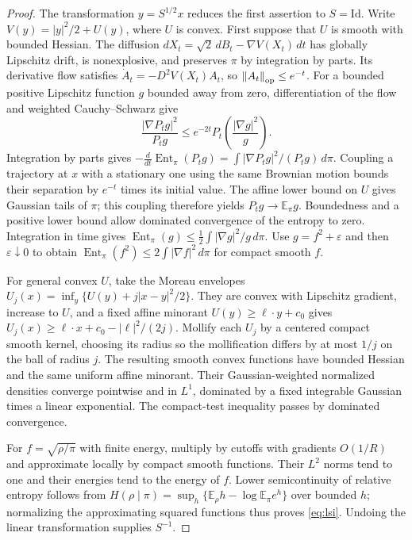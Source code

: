 \documentclass[11pt]{article}
\theoremstyle{remark}\newtheorem{remark}[theorem]{Remark}
\newcommand{\E}{\mathbb E}
\newcommand{\Id}{\mathrm{Id}}
\newcommand{\norm}[1]{\left\lVert #1\right\rVert}
\begin{document}
\begin{proof}
The transformation $y=S^{1/2}x$ reduces the first assertion to $S=\Id$.
Write $V(y)=|y|^2/2+U(y)$, where $U$ is convex. First suppose that $U$
is smooth with bounded Hessian. The diffusion
$dX_t=\sqrt2\,dB_t-\nabla V(X_t)\,dt$ has globally Lipschitz drift, is
nonexplosive, and preserves $\pi$ by integration by parts.
Its derivative flow satisfies $\dot A_t=-D^2V(X_t)A_t$, so
$\norm{A_t}_{\rm op}\le e^{-t}$. For a bounded positive Lipschitz function
$g$ bounded away from zero, differentiation of the flow and weighted
Cauchy--Schwarz give
\[
\frac{|\nabla P_tg|^2}{P_tg}
\le e^{-2t}P_t\!\left(\frac{|\nabla g|^2}{g}\right).
\]
Integration by parts gives
$-\frac{d}{dt}\operatorname{Ent}_\pi(P_tg)
=\int|\nabla P_tg|^2/(P_tg)\,d\pi$.
Coupling a trajectory at $x$ with a stationary one using the same Brownian
motion bounds their separation by $e^{-t}$ times its initial value.
The affine lower bound on $U$ gives Gaussian tails of $\pi$; this coupling
therefore yields $P_tg\to\E_\pi g$. Boundedness and a positive lower bound
allow dominated convergence of the entropy to zero. Integration in time
gives
$\operatorname{Ent}_\pi(g)\le\frac12\int|\nabla g|^2/g\,d\pi$.
Use $g=f^2+\varepsilon$ and then $\varepsilon\downarrow0$ to obtain
$\operatorname{Ent}_\pi(f^2)\le2\int|\nabla f|^2\,d\pi$ for compact smooth $f$.

For general convex $U$, take the Moreau envelopes
$U_j(x)=\inf_y\{U(y)+j|x-y|^2/2\}$.
They are convex with Lipschitz gradient, increase to $U$, and a fixed affine
minorant $U(y)\ge\ell\cdot y+c_0$ gives
$U_j(x)\ge\ell\cdot x+c_0-|\ell|^2/(2j)$.
Mollify each $U_j$ by a centered compact smooth kernel, choosing its radius
so the mollification differs by at most $1/j$ on the ball of radius $j$.
The resulting smooth convex functions have bounded Hessian and the same
uniform affine minorant. Their Gaussian-weighted normalized densities
converge pointwise and in $L^1$, dominated by a fixed integrable Gaussian
times a linear exponential. The compact-test inequality passes by dominated
convergence.

For $f=\sqrt{\rho/\pi}$ with finite energy, multiply by cutoffs with gradients
$O(1/R)$ and approximate locally by compact smooth functions. Their $L^2$
norms tend to one and their energies tend to the energy of $f$.
Lower semicontinuity of relative entropy follows from
$H(\rho\mid\pi)=\sup_h\{\E_\rho h-\log\E_\pi e^h\}$ over bounded $h$;
normalizing the approximating squared functions thus proves \eqref{eq:lsi}.
Undoing the linear transformation supplies $S^{-1}$.


\end{proof}
\end{document}
